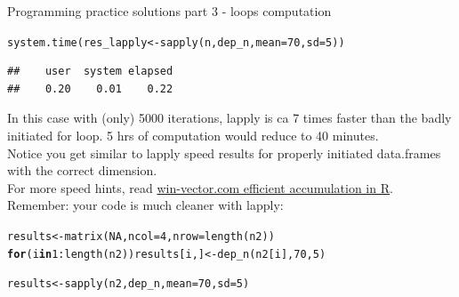 \documentclass[xcolor=table,       handout,    xcolor=dvipsnames]{beamer}\usepackage[]{graphicx}\usepackage[]{color}
\makeatletter
\newcommand{\hlnum}[1]{\textcolor[rgb]{0,0,0}{#1}}
\newcommand{\hlopt}[1]{\textcolor[rgb]{0,0,0}{#1}}
\newcommand{\hlstd}[1]{\textcolor[rgb]{0,0,0}{#1}}
\newcommand{\hlkwa}[1]{\textcolor[rgb]{1,0,0}{\textbf{#1}}}
\newcommand{\hlkwb}[1]{\textcolor[rgb]{0,0,0}{#1}}
\newcommand{\hlkwc}[1]{\textcolor[rgb]{1,0,1}{#1}}
\newcommand{\hlkwd}[1]{\textcolor[rgb]{0,0,1}{#1}}
\newenvironment{kframe}{%
 \def\at@end@of@kframe{}%
 \ifinner\ifhmode%
  \def\at@end@of@kframe{\end{minipage}}%
  \begin{minipage}{\columnwidth}%
 \fi\fi%
 \def\FrameCommand##1{\hskip\@totalleftmargin \hskip-\fboxsep
 \colorbox{shadecolor}{##1}\hskip-\fboxsep
     \hskip-\linewidth \hskip-\@totalleftmargin \hskip\columnwidth}%
 \MakeFramed {\advance\hsize-\width
   \@totalleftmargin\z@ \linewidth\hsize
   \@setminipage}}%
 {\par\unskip\endMakeFramed%
 \at@end@of@kframe}
\newenvironment{knitrout}{}{} %
\makeatother
\begin{document}
\begin{frame}[fragile]{Programming practice solutions part 3 - loops computation}
\begin{knitrout}
\color{fgcolor}\begin{kframe}
\begin{alltt}
\hlkwd{system.time}\hlstd{(res_lapply} \hlkwb{<-} \hlkwd{sapply}\hlstd{(n, dep_n,} \hlkwc{mean}\hlstd{=}\hlnum{70}\hlstd{,}\hlkwc{sd}\hlstd{=}\hlnum{5}\hlstd{)  )}
\end{alltt}
\begin{verbatim}
##    user  system elapsed 
##    0.20    0.01    0.22
\end{verbatim}
\end{kframe}
\end{knitrout}
In this case with (only) 5000 iterations, lapply is ca 7 times faster than the badly initiated for loop. 5 hrs of computation would reduce to 40 minutes.\\
Notice you get similar to lapply speed  results for properly initiated data.frames with the correct dimension.\\
For more speed hints, read \href{http://www.win-vector.com/blog/2015/07/efficient-accumulation-in-r/}{win-vector.com efficient accumulation in R}.\\
Remember: your code is much cleaner with lapply:\\
\begin{knitrout}
\color{fgcolor}\begin{kframe}
\begin{alltt}
\hlstd{results} \hlkwb{<-} \hlkwd{matrix}\hlstd{(}\hlnum{NA}\hlstd{,} \hlkwc{ncol}\hlstd{=}\hlnum{4}\hlstd{,} \hlkwc{nrow}\hlstd{=}\hlkwd{length}\hlstd{(n2))}
\hlkwa{for}\hlstd{(i} \hlkwa{in} \hlnum{1}\hlopt{:}\hlkwd{length}\hlstd{(n2)) results[i, ]} \hlkwb{<-} \hlkwd{dep_n}\hlstd{(n2[i],} \hlnum{70}\hlstd{,}\hlnum{5}\hlstd{)}

\hlstd{results} \hlkwb{<-} \hlkwd{sapply}\hlstd{(n2, dep_n,} \hlkwc{mean}\hlstd{=}\hlnum{70}\hlstd{,}\hlkwc{sd}\hlstd{=}\hlnum{5}\hlstd{)}
\end{alltt}
\end{kframe}
\end{knitrout}
\end{frame}

\end{document}

